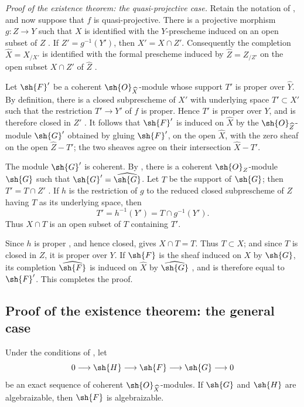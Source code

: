 \begin{env}[5.2.6]
\label{III.5.2.6}
\emph{Proof of the existence theorem: the quasi-projective case.}
Retain the notation of , and now suppose that $f$
is quasi-projective.  There is a projective morphism
$g:Z\to Y$ such that $X$ is identified with the $Y$-prescheme
induced on an open subset of $Z$ .  If
$Z'=g^{-1}(Y')$, then $X'=X\cap Z'$.  Consequently the completion
$\widehat{X}=X_{/X'}$ is identified with the formal prescheme
induced by $\widehat{Z}=Z_{/Z'}$ on the open subset $X\cap Z'$ of
$\widehat{Z}$ .

Let $\sh{F}'$ be a coherent $\sh{O}_{\widehat{X}}$-module whose
support $T'$ is proper over $\widehat{Y}$.  By definition, there
is a closed subprescheme of $X'$ with underlying space
$T'\subset X'$ such that the restriction $T'\to Y'$ of $f$ is
proper.  Hence $T'$ is proper over $Y$, and is therefore closed in
$Z'$ .  It follows that $\sh{F}'$ is induced
on $\widehat{X}$ by the $\sh{O}_{\widehat{Z}}$-module $\sh{G}'$
obtained by gluing $\sh{F}'$, on the open $\widehat{X}$, with the
zero sheaf on the open $\widehat{Z}-T'$; the two sheaves agree on
their intersection $\widehat{X}-T'$.

The module $\sh{G}'$ is coherent.  By , there is a
coherent $\sh{O}_Z$-module $\sh{G}$ such that
$\sh{G}'=\widehat{\sh{G}}$.  Let $T$ be the support of $\sh{G}$;
then $T'=T\cap Z'$ .  If $h$ is the restriction
of $g$ to the reduced closed subprescheme of $Z$ having $T$ as
its underlying space, then
\[
  T'=h^{-1}(Y')=T\cap g^{-1}(Y').
\]
Thus $X\cap T$ is an open subset of $T$ containing $T'$.

Since $h$ is proper , and hence closed,
 gives $X\cap T=T$.  Thus $T\subset X$; and
since $T$ is closed in $Z$, it is proper over $Y$.  If $\sh{F}$ is
the sheaf induced on $X$ by $\sh{G}$, its completion
$\widehat{\sh{F}}$ is induced on $\widehat{X}$ by
$\widehat{\sh{G}}$ , and is therefore equal to
$\sh{F}'$.  This completes the proof.
\end{env}


\subsection{Proof of the existence theorem: the general case}
\label{subsection:III.5.3}

\begin{lemma}[5.3.1]
\label{III.5.3.1}
Under the conditions of , let
\[
  0\longrightarrow\sh{H}\longrightarrow\sh{F}
  \longrightarrow\sh{G}\longrightarrow0
\]
be an exact sequence of coherent
$\sh{O}_{\widehat{X}}$-modules.  If $\sh{G}$ and $\sh{H}$ are
algebraizable, then $\sh{F}$ is algebraizable.
\end{lemma}

